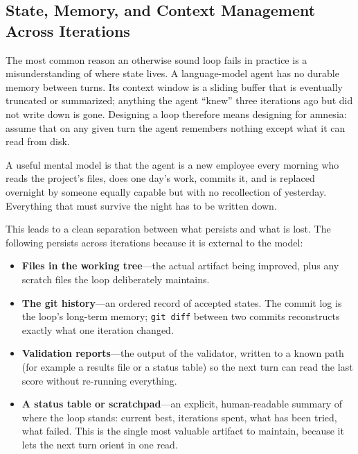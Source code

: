\subsection{State, Memory, and Context Management Across Iterations}\label{subsec:state-memory-context}

The most common reason an otherwise sound loop fails in practice is a
misunderstanding of where state lives. A language-model agent has no durable
memory between turns. Its context window is a sliding buffer that is eventually
truncated or summarized; anything the agent ``knew'' three iterations ago but did
not write down is gone. Designing a loop therefore means designing for amnesia:
assume that on any given turn the agent remembers nothing except what it can read
from disk.

\begin{remark}
A useful mental model is that the agent is a new employee every morning who reads
the project's files, does one day's work, commits it, and is replaced overnight
by someone equally capable but with no recollection of yesterday. Everything that
must survive the night has to be written down.
\end{remark}

This leads to a clean separation between what persists and what is lost. The
following persists across iterations because it is external to the model:

\begin{itemize}
  \item \textbf{Files in the working tree}---the actual artifact being improved,
        plus any scratch files the loop deliberately maintains.
  \item \textbf{The git history}---an ordered record of accepted states. The
        commit log is the loop's long-term memory; \texttt{git diff} between two
        commits reconstructs exactly what one iteration changed.
  \item \textbf{Validation reports}---the output of the validator, written to a
        known path (for example a results file or a status table) so the next
        turn can read the last score without re-running everything.
  \item \textbf{A status table or scratchpad}---an explicit, human-readable
        summary of where the loop stands: current best, iterations spent, what
        has been tried, what failed. This is the single most valuable artifact to
        maintain, because it lets the next turn orient in one read.
\end{itemize}

